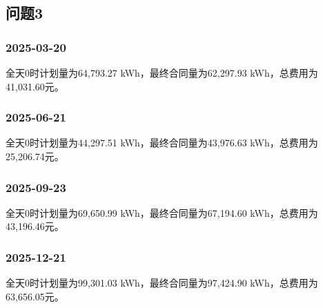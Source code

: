 \subsection{问题3}
\noindent\begin{minipage}{\linewidth}
\subsubsection*{2025-03-20}


全天0时计划量为64,793.27 kWh，最终合同量为62,297.93 kWh，总费用为41,031.60元。


\end{minipage}
\par\medskip
\noindent\begin{minipage}{\linewidth}
\subsubsection*{2025-06-21}


全天0时计划量为44,297.51 kWh，最终合同量为43,976.63 kWh，总费用为25,206.74元。


\end{minipage}
\par\medskip
\noindent\begin{minipage}{\linewidth}
\subsubsection*{2025-09-23}


全天0时计划量为69,650.99 kWh，最终合同量为67,194.60 kWh，总费用为43,196.46元。


\end{minipage}
\par\medskip
\noindent\begin{minipage}{\linewidth}
\subsubsection*{2025-12-21}


全天0时计划量为99,301.03 kWh，最终合同量为97,424.90 kWh，总费用为63,656.05元。


\end{minipage}
\par\medskip


